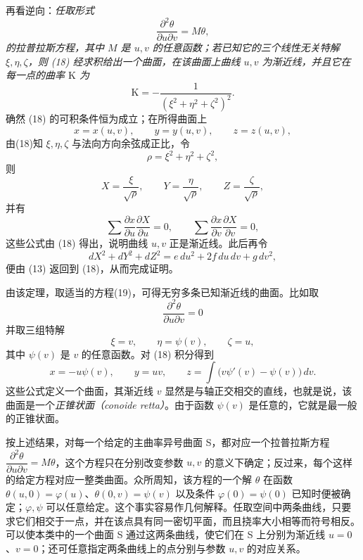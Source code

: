 再看逆向：\emph{任取形式}
\[
 \frac{\partial^2\theta}{\partial u\partial v}=M\theta,
\]
\emph{的拉普拉斯方程，其中 \(M\) 是 \(u,v\) 的任意函数；若已知它的三个线性无关特解 \(\xi,\eta,\zeta\)，则 (18) 经求积给出一个曲面，在该曲面上曲线 \(u,v\) 为渐近线，并且它在每一点的曲率 \(\mathrm K\) 为}
\[
 \mathrm K=-\frac1{(\xi^2+\eta^2+\zeta^2)^2}.
\]
确然 (18) 的可积条件恒为成立；在所得曲面上
\[
 x=x(u,v),
 \qquad
 y=y(u,v),
 \qquad
 z=z(u,v),
\]
由(18)知 \(\xi,\eta,\zeta\) 与法向方向余弦成正比，令
\[
 \rho=\xi^2+\eta^2+\zeta^2,
\]
则
\[
 X=\frac{\xi}{\sqrt\rho},
 \qquad
 Y=\frac{\eta}{\sqrt\rho},
 \qquad
 Z=\frac{\zeta}{\sqrt\rho},
\]
并有
\[
 \sum\frac{\partial x}{\partial u}\frac{\partial X}{\partial u}=0,
 \qquad
 \sum\frac{\partial x}{\partial v}\frac{\partial X}{\partial v}=0,
\]
这些公式由 (18) 得出，说明曲线 \(u,v\) 正是渐近线。此后再令
\[
 dX^2+dY^2+dZ^2=e\,du^2+2f\,du\,dv+g\,dv^2,
\]
便由 (13) 返回到 (18)，从而完成证明。

由该定理，取适当的方程(19)，可得无穷多条已知渐近线的曲面。比如取
\[
 \frac{\partial^2\theta}{\partial u\partial v}=0
\]
并取三组特解
\[
 \xi=v,
 \qquad
 \eta=\psi(v),
 \qquad
 \zeta=u,
\]
其中 \(\psi(v)\) 是 \(v\) 的任意函数。对 (18) 积分得到
\begin{equation}\tag{20}
 x=-u\psi(v),
 \qquad
 y=uv,
 \qquad
 z=\int\bigl(v\psi'(v)-\psi(v)\bigr)\,dv.
\end{equation}
这些公式定义一个曲面，其渐近线 \(v\) 显然是与轴正交相交的直线，也就是说，该曲面是一个\emph{正锥状面（conoide retta）}。由于函数 \(\psi(v)\) 是任意的，它就是最一般的正锥状面。

按上述结果，对每一个给定的主曲率异号曲面 S，都对应一个拉普拉斯方程 \(\dfrac{\partial^2\theta}{\partial u\partial v}=M\theta\)，这个方程只在分别改变参数 \(u,v\) 的意义下确定；反过来，每个这样的给定方程对应一整类曲面。众所周知，该方程的一个解 \(\theta\) 在函数 \(\theta(u,0)=\varphi(u)\)、\(\theta(0,v)=\psi(v)\) 以及条件 \(\varphi(0)=\psi(0)\) 已知时便被确定；\(\varphi,\psi\) 可以任意给定。这个事实容易作几何解释。任取空间中两条曲线，只要求它们相交于一点，并在该点具有同一密切平面，而且挠率大小相等而符号相反。可以使本类中的一个曲面 S 通过这两条曲线，使它们在 S 上分别为渐近线 \(u=0\)、\(v=0\)；还可任意指定两条曲线上的点分别与参数 \(u,v\) 的对应关系。

